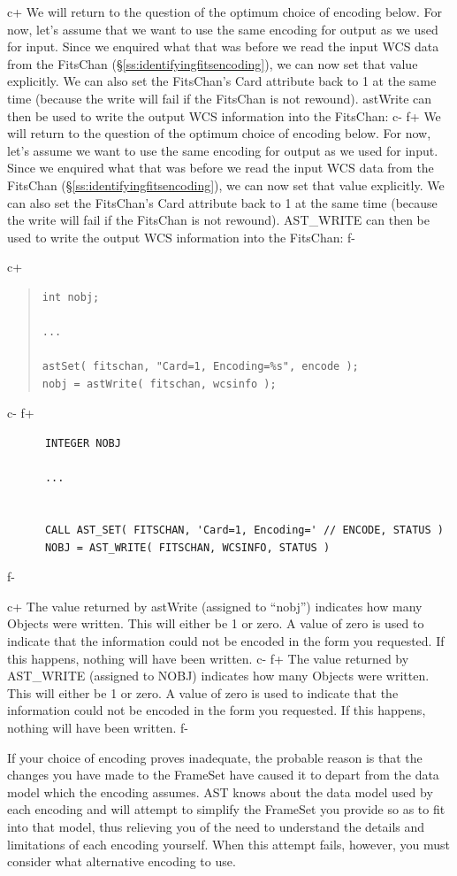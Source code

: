 \documentclass[twoside,11pt]{article}
\newcommand{\secref}[1]{\S\ref{#1}}
\newcommand{\secref}[1]{\ref{#1}}
\begin{document}
c+
We will return to the question of the optimum choice of encoding
below.  For now, let's assume that we want to use the same encoding
for output as we used for input. Since we enquired what that was
before we read the input WCS data from the FitsChan
(\secref{ss:identifyingfitsencoding}), we can now set that value
explicitly. We can also set the FitsChan's Card attribute back to 1 at
the same time (because the write will fail if the FitsChan is not
rewound). astWrite can then be used to write the output WCS
information into the FitsChan:
c-
f+
We will return to the question of the optimum choice of encoding
below.  For now, let's assume we want to use the same encoding for
output as we used for input. Since we enquired what that was before we
read the input WCS data from the FitsChan
(\secref{ss:identifyingfitsencoding}), we can now set that value
explicitly. We can also set the FitsChan's Card attribute back to 1 at
the same time (because the write will fail if the FitsChan is not
rewound). AST\_WRITE can then be used to write the output WCS
information into the FitsChan:
f-

c+
\begin{quote}
\small
\begin{verbatim}
int nobj;

...

astSet( fitschan, "Card=1, Encoding=%s", encode );
nobj = astWrite( fitschan, wcsinfo );
\end{verbatim}
\normalsize
\end{quote}
c-
f+
\small
\begin{verbatim}
      INTEGER NOBJ

      ...


      CALL AST_SET( FITSCHAN, 'Card=1, Encoding=' // ENCODE, STATUS )
      NOBJ = AST_WRITE( FITSCHAN, WCSINFO, STATUS )
\end{verbatim}
\normalsize
f-

c+
The value returned by astWrite (assigned to ``nobj'') indicates how
many Objects were written. This will either be 1 or zero. A value of
zero is used to indicate that the information could not be encoded in
the form you requested. If this happens, nothing will have been
written.
c-
f+
The value returned by AST\_WRITE (assigned to NOBJ) indicates how many
Objects were written. This will either be 1 or zero. A value of zero
is used to indicate that the information could not be encoded in the
form you requested. If this happens, nothing will have been written.
f-

If your choice of encoding proves inadequate, the probable reason is
that the changes you have made to the FrameSet have caused it to
depart from the data model which the encoding assumes.  AST knows
about the data model used by each encoding and will attempt to
simplify the FrameSet you provide so as to fit into that model, thus
relieving you of the need to understand the details and limitations of
each encoding yourself. When this attempt fails, however, you must
consider what alternative encoding to use.
\end{document}
